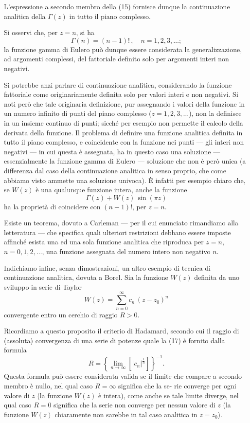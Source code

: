 \documentclass[11pt, a4paper]{book}
\numberwithin{equation}{section}
\begin{document}
L'espressione a secondo membro della (15) fornisce dunque la continuazione analitica della $\Gamma(z)$ in tutto il piano complesso.

Si osservi che, per $z=n$, si ha
\[
\Gamma(n) = (n-1)!\,, \quad n = 1, 2, 3, \ldots;
\]
la funzione gamma di Eulero può dunque essere considerata la generalizzazione, ad argomenti complessi, del fattoriale definito solo per argomenti interi non negativi.

Si potrebbe anzi parlare di continuazione analitica, considerando la funzione fattoriale come originariamente definita solo per valori interi e non negativi. Si noti però che tale originaria definizione, pur assegnando i valori della funzione in un numero infinito di punti del piano complesso ($z=1,2,3,\ldots$), non la definisce in un insieme continuo di punti; sicché per esempio non permette il calcolo della derivata della funzione. Il problema di definire una funzione analitica definita in tutto il piano complesso, e coincidente con la funzione nei punti — gli interi non negativi — in cui questa è assegnata, ha in questo caso una soluzione — essenzialmente la funzione gamma di Eulero — soluzione che non è però unica (a differenza dal caso della continuazione analitica in senso proprio, che come abbiamo visto ammette una soluzione univoca). È infatti per esempio chiaro che, se $W(z)$ è una qualunque funzione intera, anche la funzione
\[
\Gamma(z) + W(z)\,\sin(\pi z)
\]
ha la proprietà di coincidere con $(n-1)!$, per $z=n$.

Esiste un teorema, dovuto a Carleman — per il cui enunciato rimandiamo alla letteratura — che specifica quali ulteriori restrizioni debbano essere imposte affinché esista una ed una sola funzione analitica che riproduca per $z=n$, $n=0,1,2,\ldots$, una funzione assegnata del numero intero non negativo $n$.

Indichiamo infine, senza dimostrazioni, un altro esempio di tecnica di continuazione analitica, dovuta a Borel. Sia la funzione $W(z)$ definita da uno sviluppo in serie di Taylor
\begin{equation}
W(z) = \sum_{n=0}^{\infty} c_n\,(z - z_0)^n \tag{17}
\end{equation}
convergente entro un cerchio di raggio $R > 0$.

Ricordiamo a questo proposito il criterio di Hadamard, secondo cui il raggio di (assoluta) convergenza di una serie di potenze quale la (17) è fornito dalla formula
\[
R = \left\{ \lim_{n \to \infty} \left[ |c_n|^{\frac{1}{n}} \right] \right\}^{-1}.
\]
Questa formula può essere considerata valida se il limite che compare a secondo membro è nullo, nel qual caso $R = \infty$ significa che la se-%
rie converge per ogni valore di $z$ (la funzione $W(z)$ è intera), come anche se tale limite diverge, nel qual caso $R=0$ significa che la serie non converge per nessun valore di $z$ (la funzione $W(z)$ chiaramente non sarebbe in tal caso analitica in $z = z_0$).
\end{document}
